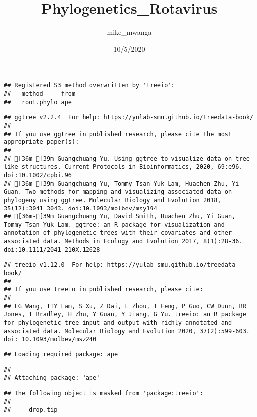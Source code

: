 \documentclass[
]{article}
\title{Phylogenetics\_Rotavirus}
\author{mike\_mwanga}
\date{10/5/2020}
\begin{document}
\maketitle

\begin{verbatim}
## Registered S3 method overwritten by 'treeio':
##   method     from
##   root.phylo ape
\end{verbatim}

\begin{verbatim}
## ggtree v2.2.4  For help: https://yulab-smu.github.io/treedata-book/
## 
## If you use ggtree in published research, please cite the most appropriate paper(s):
## 
## [36m-[39m Guangchuang Yu. Using ggtree to visualize data on tree-like structures. Current Protocols in Bioinformatics, 2020, 69:e96. doi:10.1002/cpbi.96
## [36m-[39m Guangchuang Yu, Tommy Tsan-Yuk Lam, Huachen Zhu, Yi Guan. Two methods for mapping and visualizing associated data on phylogeny using ggtree. Molecular Biology and Evolution 2018, 35(12):3041-3043. doi:10.1093/molbev/msy194
## [36m-[39m Guangchuang Yu, David Smith, Huachen Zhu, Yi Guan, Tommy Tsan-Yuk Lam. ggtree: an R package for visualization and annotation of phylogenetic trees with their covariates and other associated data. Methods in Ecology and Evolution 2017, 8(1):28-36. doi:10.1111/2041-210X.12628
\end{verbatim}

\begin{verbatim}
## treeio v1.12.0  For help: https://yulab-smu.github.io/treedata-book/
## 
## If you use treeio in published research, please cite:
## 
## LG Wang, TTY Lam, S Xu, Z Dai, L Zhou, T Feng, P Guo, CW Dunn, BR Jones, T Bradley, H Zhu, Y Guan, Y Jiang, G Yu. treeio: an R package for phylogenetic tree input and output with richly annotated and associated data. Molecular Biology and Evolution 2020, 37(2):599-603. doi: 10.1093/molbev/msz240
\end{verbatim}

\begin{verbatim}
## Loading required package: ape
\end{verbatim}

\begin{verbatim}
## 
## Attaching package: 'ape'
\end{verbatim}

\begin{verbatim}
## The following object is masked from 'package:treeio':
## 
##     drop.tip
\end{verbatim}
\end{document}
